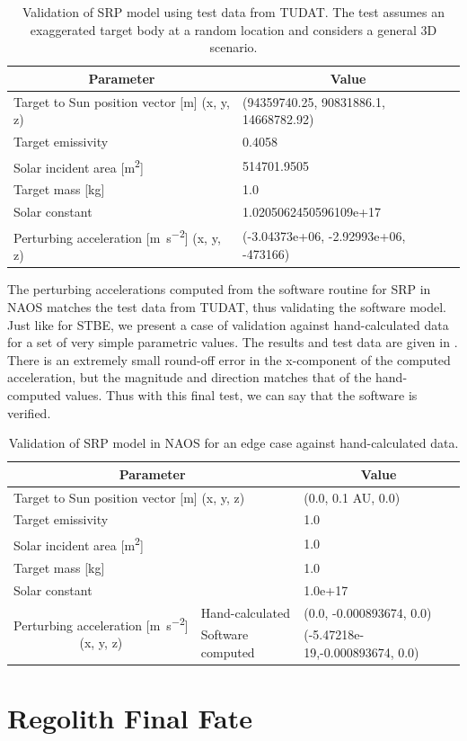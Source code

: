 \begin{table}[htb]
\centering
\captionsetup{justification=centering}
\caption{Validation of \gls{SRP} model using test data from \gls{TUDAT}. The test assumes an exaggerated target body at a random location and considers a general 3D scenario.}
\label{tab:srp_vv_tudat_data_2}
\begin{tabular}{|l|l|}
\hline
\multicolumn{1}{|c|}{\textbf{Parameter}} & \multicolumn{1}{c|}{\textbf{Value}} \\ \hline
Target to Sun position vector {[}m{]} (x, y, z) & (94359740.25, 90831886.1, 14668782.92) \\ \hline
Target emissivity & 0.4058 \\ \hline
Solar incident area {[}\si{\metre \squared}{]} & 514701.9505 \\ \hline
Target mass {[}kg{]} & 1.0 \\ \hline
Solar constant & 1.0205062450596109e+17 \\ \hline
Perturbing acceleration {[}\si{\metre \per \second \squared}{]} (x, y, z) & (-3.04373e+06, -2.92993e+06, -473166) \\ \hline
\end{tabular}
\end{table}
\FloatBarrier
The perturbing accelerations computed from the software routine for \gls{SRP} in \gls{NAOS} matches the test data from \gls{TUDAT}, thus validating the software model. Just like for \gls{STBE}, we present a case of validation against hand-calculated data for a set of very simple parametric values. The results and test data are given in . There is an extremely small round-off error in the x-component of the computed acceleration, but the magnitude and direction matches that of the hand-computed values. Thus with this final test, we can say that the software is verified.
\begin{table}[htb]
\centering
\captionsetup{justification=centering}
\caption{Validation of \gls{SRP} model in \gls{NAOS} for an edge case against hand-calculated data.}
\label{tab:srp_vv_hand_calc_data}
\begin{tabular}{|l|l|l|}
\hline
\multicolumn{2}{|c|}{\textbf{Parameter}} & \multicolumn{1}{c|}{\textbf{Value}} \\ \hline
\multicolumn{2}{|l|}{Target to Sun position vector {[}m{]} (x, y, z)} & (0.0, 0.1 AU, 0.0) \\ \hline
\multicolumn{2}{|l|}{Target emissivity} & 1.0 \\ \hline
\multicolumn{2}{|l|}{Solar incident area {[}\si{\metre \squared}{]}} & 1.0 \\ \hline
\multicolumn{2}{|l|}{Target mass {[}kg{]}} & 1.0 \\ \hline
\multicolumn{2}{|l|}{Solar constant} & 1.0e+17 \\ \hline
\multicolumn{1}{|c|}{\multirow{2}{*}{Perturbing acceleration {[}\si{\metre \per \second \squared}{]} (x, y, z)}} & Hand-calculated & (0.0, -0.000893674, 0.0) \\ \cline{2-3}
\multicolumn{1}{|c|}{} & Software computed & (-5.47218e-19,-0.000893674, 0.0) \\ \hline
\end{tabular}
\end{table}
\FloatBarrier

\section{Regolith Final Fate}
\label{sec:final_fate_vv}
